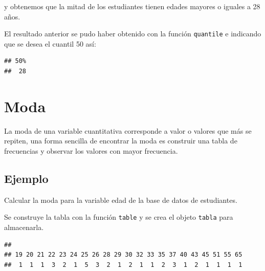 \documentclass[
]{book}
\makeatletter
\newenvironment{Shaded}{\begin{snugshade}}{\end{snugshade}}
\newcommand{\AttributeTok}[1]{\textcolor[rgb]{0.77,0.63,0.00}{#1}}
\newcommand{\FloatTok}[1]{\textcolor[rgb]{0.00,0.00,0.81}{#1}}
\newcommand{\FunctionTok}[1]{\textcolor[rgb]{0.00,0.00,0.00}{#1}}
\newcommand{\NormalTok}[1]{#1}
\newcommand{\OtherTok}[1]{\textcolor[rgb]{0.56,0.35,0.01}{#1}}
\newcommand{\SpecialCharTok}[1]{\textcolor[rgb]{0.00,0.00,0.00}{#1}}
\newenvironment{kframe}{%
\medskip{}
\setlength{\fboxsep}{.8em}
 \def\at@end@of@kframe{}%
 \ifinner\ifhmode%
  \def\at@end@of@kframe{\end{minipage}}%
  \begin{minipage}{\columnwidth}%
 \fi\fi%
 \def\FrameCommand##1{\hskip\@totalleftmargin \hskip-\fboxsep
 \colorbox{shadecolor}{##1}\hskip-\fboxsep
     \hskip-\linewidth \hskip-\@totalleftmargin \hskip\columnwidth}%
 \MakeFramed {\advance\hsize-\width
   \@totalleftmargin\z@ \linewidth\hsize
   \@setminipage}}%
 {\par\unskip\endMakeFramed%
 \at@end@of@kframe}
\renewenvironment{Shaded}{\begin{kframe}}{\end{kframe}}
\makeatother
\begin{document}
y obtenemos que la mitad de los estudiantes tienen edades mayores o iguales a 28 años.

El resultado anterior se pudo haber obtenido con la función \texttt{quantile} e indicando que se desea el cuantil 50 así:

\begin{Shaded}
\end{Shaded}

\begin{verbatim}
## 50% 
##  28
\end{verbatim}

\hypertarget{moda}{%
\section{\texorpdfstring{Moda }{Moda }}\label{moda}}

La moda de una variable cuantitativa corresponde a valor o valores que más se repiten, una forma sencilla de encontrar la moda es construir una tabla de frecuencias y observar los valores con mayor frecuencia.

\hypertarget{ejemplo-34}{%
\subsection*{Ejemplo}\label{ejemplo-34}}

Calcular la moda para la variable edad de la base de datos de estudiantes.

Se construye la tabla con la función \texttt{table} y se crea el objeto \texttt{tabla} para almacenarla.

\begin{Shaded}
\end{Shaded}

\begin{verbatim}
## 
## 19 20 21 22 23 24 25 26 28 29 30 32 33 35 37 40 43 45 51 55 65 
##  1  1  1  3  2  1  5  3  2  1  2  1  1  2  3  1  2  1  1  1  1
\end{verbatim}
\end{document}
